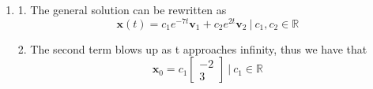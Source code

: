 \documentclass[12pt]{article}
\begin{document}
\begin{enumerate}
        4. Thus the general solution is
        \begin{align*}
          e^{tA} & = Ve^{tD}V^{-1}                                                                                                                                                 \\
                 & = \frac{1}{9} \begin{bmatrix} -2 & 1 \\ 3 & 3\end{bmatrix} \begin{bmatrix} e^{-7t} & 0 \\ 0 & e^{2t} \end{bmatrix}\begin{bmatrix} -3 & 1 \\ 3 & 2 \end{bmatrix} \\
                 & = \frac{1}{9} \begin{bmatrix} 3e^{2t} +6e^{-7t} & 2e^{2t}-2e^{-7t} \\ 9e^{2t}-9e^{-7t} & 6e^{2t}+3e^{-7t} \end{bmatrix}
        \end{align*}

  \item [(b)]

        1. The general solution can be rewritten as
        \[
          \mathbf{x}(t) = c_1e^{-7t}\mathbf{v}_1 + c_2e^{2t}\mathbf{v}_2 ~|~ c_1, c_2 \in{\mathbb{R}}
        \]

        2. The second term blows up as t approaches infinity, thus we have that
        \[
          \mathbf{x}_0 = c_1\begin{bmatrix} -2 \\ 3\end{bmatrix} ~|~ c_1 \in{\mathbb{R}}
        \]
\end{enumerate}
\end{document}
